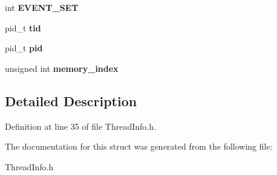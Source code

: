 \begin{DoxyCompactItemize}
\item 
\hypertarget{structthread__info_a21c57b3b3441bb52f7f8608cfb2e5db3}{int {\bfseries E\-V\-E\-N\-T\-\_\-\-S\-E\-T}}\label{structthread__info_a21c57b3b3441bb52f7f8608cfb2e5db3}

\item 
\hypertarget{structthread__info_a9ffe0e56ec9e7525cf6cb1833d79429b}{pid\-\_\-t {\bfseries tid}}\label{structthread__info_a9ffe0e56ec9e7525cf6cb1833d79429b}

\item 
\hypertarget{structthread__info_a34abfb7632807b7d3a61ed3a68e7f896}{pid\-\_\-t {\bfseries pid}}\label{structthread__info_a34abfb7632807b7d3a61ed3a68e7f896}

\item 
\hypertarget{structthread__info_acfedadd4c596089d7b4cb12f5729b8b1}{unsigned int {\bfseries memory\-\_\-index}}\label{structthread__info_acfedadd4c596089d7b4cb12f5729b8b1}

\end{DoxyCompactItemize}


\subsection{Detailed Description}


Definition at line 35 of file Thread\-Info.\-h.



The documentation for this struct was generated from the following file\-:\begin{DoxyCompactItemize}
\item 
Thread\-Info.\-h\end{DoxyCompactItemize}
